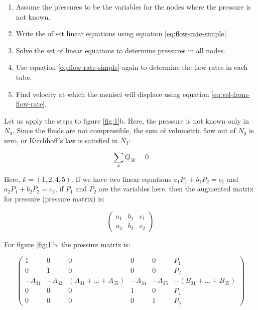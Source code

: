 \documentclass[
	12pt
] {article}
\begin{document}
	\begin{enumerate}
		\item Assume the pressures to be the variables for the nodes where the pressure is not known.
		
		\item Write the of set linear equations using equation \ref{eq:flow-rate-simple}.
		
		\item Solve the set of linear equations to determine pressures in all nodes.
		
		\item Use equation \ref{eq:flow-rate-simple} again to determine the flow rates in each tube.
		
		\item Find velocity at which the menisci will displace using equation \ref{eq:vel-from-flow-rate}.
	\end{enumerate}
		
	Let us apply the steps to figure \ref{fig:1}b. Here, the pressure is not known only in $N_3$. Since the fluids are not compressible, the sum of volumetric flow out of $N_3$ is zero, or Kirchhoff's law is satisfied in $N_3$:
	
	\begin{equation} \label{eq:sum-flow-node-zero}
		\sum_{k} Q_{3k} = 0
	\end{equation}

	Here, $k = (1, 2, 4, 5)$. If we have two linear equations $a_1 P_1 + b_1 P_2 = c_1$ and $a_2 P_1 + b_2 P_2 = c_2$, if $P_1$ and $P_2$ are the variables here, then the augmented matrix for pressure (pressure matrix) is:
	
	\begin{equation}
		\begin{pmatrix}
			a_1 & b_1 & c_1\\
			a_2 & b_2 & c_2
		\end{pmatrix}
	\end{equation}
	
	For figure \ref{fig:1}b, the pressure matrix is:
	
	\begin{equation} \label{eq:matrix-open-sys-5-nodes}
		\begin{pmatrix}
			1 & 0 & 0 & 0 & 0 & P_{1}\\
			0 & 1 & 0 & 0 & 0 & P_{2}\\
			-A_{31} & -A_{32} & (A_{31} + ... + A_{35}) & -A_{34} & -A_{35} & -(B_{31} + ... + B_{35})\\
			0 & 0 & 0 & 1 & 0 & P_{4}\\
			0 & 0 & 0 & 0 & 1 & P_{5}
		\end{pmatrix}
	\end{equation}
	
\end{document}
